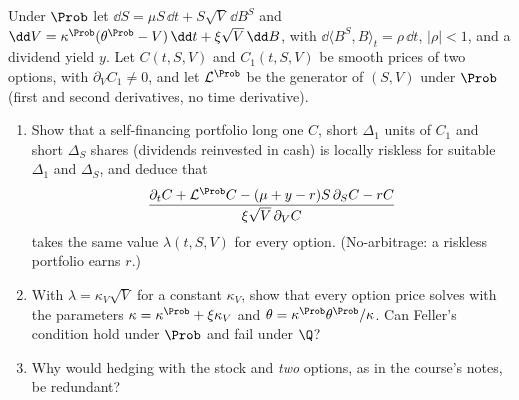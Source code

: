
\begin{exercise}\label{ex:sv-risk-premium}
\easy Under $\Prob$ let $\dd S=\mu S\,\dd t+S\sqrt V\,\dd B^S$ and $\dd V=\kappa^{\Prob}(\theta^{\Prob}-V)\,\dd t+\xi\sqrt V\,\dd B$,
with $\dd\langle B^S,B\rangle_t=\rho\,\dd t$, $|\rho|<1$, and a dividend yield $y$. Let $C(t,S,V)$ and $C_1(t,S,V)$ be
smooth prices of two options, with $\partial_VC_1\ne0$, and let $\mathcal L^{\Prob}$ be the generator of $(S,V)$
under $\Prob$ (first and second derivatives, no time derivative).
\begin{enumerate}[label=(\alph*)]
  \item Show that a self-financing portfolio long one $C$, short $\Delta_1$ units of $C_1$ and short $\Delta_S$
    shares (dividends reinvested in cash) is locally riskless for suitable $\Delta_1$ and $\Delta_S$, and deduce that
    \[
      \frac{\partial_tC+\mathcal L^{\Prob}C-(\mu+y-r)S\,\partial_SC-rC}{\xi\sqrt V\,\partial_VC}
    \]
    takes the same value $\lambda(t,S,V)$ for every option. (No-arbitrage: a riskless portfolio earns $r$.)
  \item With $\lambda=\kappa_V\sqrt V$ for a constant $\kappa_V$, show that every option price solves
     with the parameters $\kappa=\kappa^{\Prob}+\xi\kappa_V$ and $\theta=\kappa^{\Prob}\theta^{\Prob}/\kappa$.
    Can Feller's condition hold under $\Prob$ and fail under $\Q$?
  \item Why would hedging with the stock and \emph{two} options, as in the course's notes, be redundant?
\end{enumerate}
\end{exercise}

